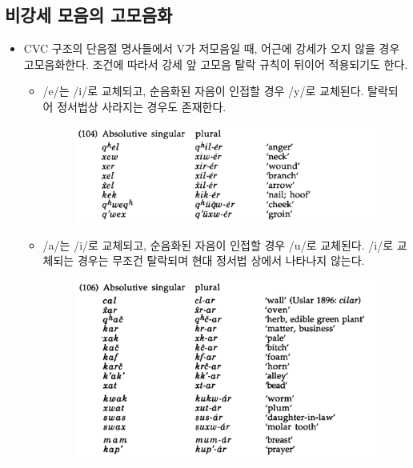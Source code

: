 \subsection{비강세 모음의 고모음화}
\begin{itemize}
\item CVC 구조의 단음절 명사들에서 V가 저모음일 때, 어근에 강세가 오지 않을 경우 고모음화한다. 조건에 따라서  강세 앞 고모음 탈락 규칙이 뒤이어 적용되기도 한다.
\begin{itemize}
\item /e/는 /i/로 교체되고, 순음화된 자음이 인접할 경우 /y/로 교체된다. 탈락되어 정서법상 사라지는 경우도 존재한다.
\begin{figure}[H]
\centerline{\includegraphics[width=.8\linewidth]{Lezgian/src/ex104.png}}
\end{figure}
\item /a/는 /i/로 교체되고, 순음화된 자음이 인접할 경우 /u/로 교체된다. /i/로 교체되는 경우는 무조건 탈락되며 현대 정서법 상에서 나타나지 않는다. 
\begin{figure}[H]
\centerline{\includegraphics[width=.8\linewidth]{Lezgian/src/ex106.png}}
\end{figure}
\end{itemize}
\end{itemize}

